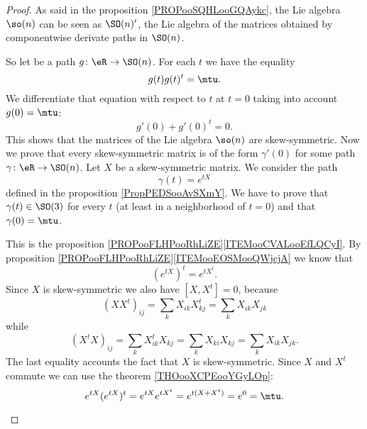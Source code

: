 \begin{proof}
	As said in the proposition \ref{PROPooSQHLooGQAykc}, the Lie algebra \( \so(n)\) can be seen as \( \SO(n)'\), the Lie algebra of the matrices obtained by componentwise derivate paths in \( \SO(n)\).

	\begin{subproof}
		So let be a path \( g\colon \eR\to \SO(n)\). For each \( t\) we have the equality
		\begin{equation}
			g(t)g(t)^t=\mtu.
		\end{equation}
		We differentiate that equation with respect to \( t\) at \( t=0\) taking into account \( g(0)=\mtu\):
		\begin{equation}
			g'(0)+g'(0)^t=0.
		\end{equation}
		This shows that the matrices of the Lie algebra \( \so(n)\) are skew-symmetric.
		Now we prove that every skew-symmetric matrix is of the form \( \gamma'(0)\) for some path \( \gamma\colon \eR\to \SO(n) \). Let \( X\) be a skew-symmetric matrix. We consider the path
		\begin{equation}
			\gamma(t)= e^{tX}
		\end{equation}
		defined in the proposition \ref{PropPEDSooAvSXmY}. We have to prove that \( \gamma(t)\in \SO(3)\) for every \( t\) (at least in a neighborhood of \( t=0\)) and that \( \gamma(0)=\mtu\).
		\begin{subproof}
			\spitem[\( \gamma(0)=\mtu\)]
			This is the proposition \ref{PROPooFLHPooRhLiZE}\ref{ITEMooCVALooEfLQCyI}.
			By proposition \ref{PROPooFLHPooRhLiZE}\ref{ITEMooEOSMooQWjcjA} we know that
			\begin{equation}
				( e^{tX})^t= e^{tX^t}.
			\end{equation}
			Since \( X\) is skew-symmetric we also have \( [X,X^t]=0\), because
			\begin{equation}
				(XX^t)_{ij}=\sum_kX_{ik}X^t_{kj}=\sum_kX_{ik}X_{jk}
			\end{equation}
			while
			\begin{equation}
				(X^tX)_{ij}=\sum_kX^t_{ik}X_{kj}=\sum_kX_{ki}X_{kj}=\sum_kX_{ik}X_{jk}.
			\end{equation}
			The last equality accounts the fact that \( X\) is skew-symmetric. Since \( X\) and \( X^t\) commute we can use the theorem \ref{THOooXCPEooYGyLOp}:
			\begin{equation}
				e^{tX}( e^{tX})^t= e^{tX} e^{tX^t}= e^{t(X+X^t)}= e^{0}=\mtu.

\end{equation}
\end{subproof}
\end{subproof}
\end{proof}
